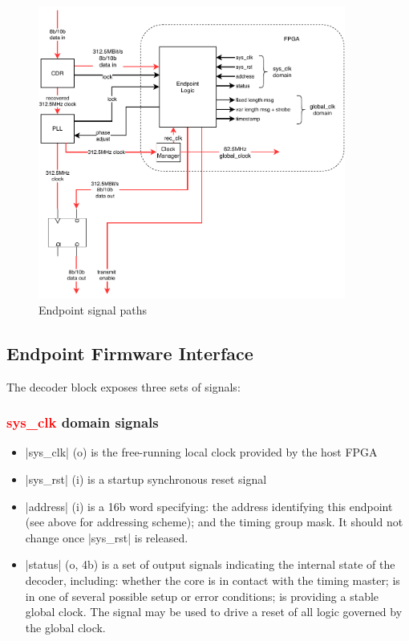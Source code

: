 \documentclass{dune}
\begin{document}
\begin{figure}[p]
	\centering
	\includegraphics[width=0.9\textwidth]{timing_endpoint_block.pdf}
	\caption{Endpoint signal paths}
	\label{fig:fw_if}
\end{figure}

\subsection{Endpoint Firmware Interface}

The decoder block exposes three sets of signals:

\subsubsection{\textcolor{red}{sys\_clk} domain signals}

\begin{itemize}
	\item |sys_clk| (o) is the free-running local clock provided by the host FPGA
	\item |sys_rst| (i) is a startup synchronous reset signal
	\item |address| (i) is a 16b word specifying: the address identifying this endpoint (see above for addressing scheme); and the timing group mask. It should not change once |sys_rst| is released.
	\item |status| (o, 4b) is a set of output signals indicating the internal state of the decoder, including: whether the core is in contact with the timing master; is in one of several possible setup or error conditions; is providing a stable global clock. The signal may be used to drive a reset of all logic governed by the global clock.
\end{itemize}
\end{document}
